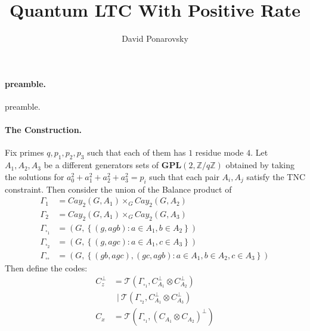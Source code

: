 \documentclass{article}
\begin{document}
\title{Quantum LTC With Positive Rate}
\author{David Ponarovsky}
\maketitle
\begin{multicols*}{2}


  \paragraph{preamble.} preamble.  
  \paragraph{The Construction.} Fix primes $q,p_1,p_2,p_3$ such that each of them has $1 $ residue mode $4$. Let $A_{1},A_{2},A_{3}$ be a different generators sets of $ \mathbf{GPL}(2 , \mathbb{Z} / q\mathbb{Z} )  $ 
  obtained by taking the solutions for $a_{0}^{2} + a_{1}^{2} +a_{2}^{2} +a_{3}^{2} = p_i $ such that each pair $A_i,A_j$ satisfy the 
  TNC constraint. Then consider the union of the Balance product of 
  \begin{equation*}
    \begin{split}
      \Gamma_{1}  &= Cay_{2}\left(  G, A_{1} \right)\times_{G} Cay_{2}\left(  G, A_{2} \right) \\
      \Gamma_{2}  &= Cay_{2}\left(  G, A_{1} \right)\times_{G} Cay_{2}\left(  G, A_{3} \right) \\
      \Gamma_{\square_{1}} &= \left( G, \left\{ \left( g, agb \right) : a \in A_{1}, b \in A_{2} \right\}  \right) \\
      \Gamma_{\square_{2}} &= \left( G, \left\{ \left( g, agc \right) : a \in A_{1}, c \in A_{3} \right\}  \right) \\
      \Gamma_{\square \square} &= \left( G, \left\{ \left( gb, agc \right), \left( gc, agb \right) :
      a \in A_{1}, b \in A_{2}, c \in A_{3} \right\}  \right) 
    \end{split}
  \end{equation*}
   Then define the codes:
	\begin{equation*}
	  \begin{split}
	    C_{z}^{\perp} & = \mathcal{T}\left( \Gamma_{\square_{1}}, C_{A_1}^{\perp} \otimes  C_{A_2}^{\perp}  \right) \\
	    & \ \ | \ \mathcal{T}\left(  \Gamma_{\square_{2}}, C_{A_1}^{\perp} \otimes C_{A_3}^{\perp}  \right) \\
	    C_{x} &=  \mathcal{T}\left(  \Gamma_{\square_{1}}, \left(  C_{A_1} \otimes C_{A_2} \right)^{\perp}  \right) \\

\end{split}
\end{equation*}
\end{multicols*}
\end{document}
